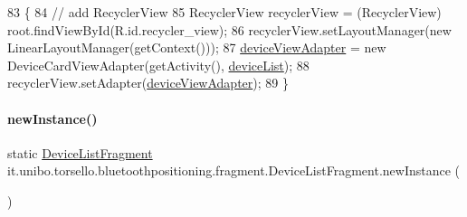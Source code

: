 \begin{DoxyCode}
83                                                    \{
84         \textcolor{comment}{// add RecyclerView}
85         RecyclerView recyclerView = (RecyclerView) root.findViewById(R.id.recycler\_view);
86         recyclerView.setLayoutManager(\textcolor{keyword}{new} LinearLayoutManager(getContext()));
87         \hyperlink{classit_1_1unibo_1_1torsello_1_1bluetoothpositioning_1_1fragment_1_1DeviceListFragment_af33bdf009badab587a755e2e40dc4bc5_af33bdf009badab587a755e2e40dc4bc5}{deviceViewAdapter} = \textcolor{keyword}{new} DeviceCardViewAdapter(getActivity(), 
      \hyperlink{classit_1_1unibo_1_1torsello_1_1bluetoothpositioning_1_1fragment_1_1DeviceListFragment_a19a4a9cff961d3c319aaa80d5412a9a6_a19a4a9cff961d3c319aaa80d5412a9a6}{deviceList});
88         recyclerView.setAdapter(\hyperlink{classit_1_1unibo_1_1torsello_1_1bluetoothpositioning_1_1fragment_1_1DeviceListFragment_af33bdf009badab587a755e2e40dc4bc5_af33bdf009badab587a755e2e40dc4bc5}{deviceViewAdapter});
89     \}
\end{DoxyCode}
\hypertarget{classit_1_1unibo_1_1torsello_1_1bluetoothpositioning_1_1fragment_1_1DeviceListFragment_aca684c7fd0da8c25be68ef7e5f80b871_aca684c7fd0da8c25be68ef7e5f80b871}{}\label{classit_1_1unibo_1_1torsello_1_1bluetoothpositioning_1_1fragment_1_1DeviceListFragment_aca684c7fd0da8c25be68ef7e5f80b871_aca684c7fd0da8c25be68ef7e5f80b871} 
\paragraph{\texorpdfstring{new\+Instance()}{newInstance()}}
{\footnotesize\ttfamily static \hyperlink{classit_1_1unibo_1_1torsello_1_1bluetoothpositioning_1_1fragment_1_1DeviceListFragment}{Device\+List\+Fragment} it.\+unibo.\+torsello.\+bluetoothpositioning.\+fragment.\+Device\+List\+Fragment.\+new\+Instance (\begin{DoxyParamCaption}{ }\end{DoxyParamCaption})\hspace{0.3cm}{\ttfamily [static]}}


